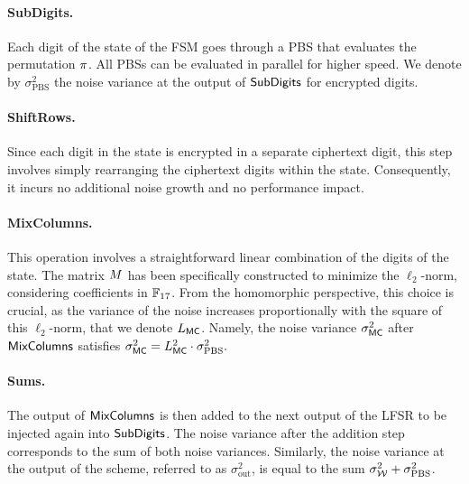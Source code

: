 \paragraph{SubDigits.} Each digit of the state of the FSM goes through a PBS that evaluates the permutation $\pi$. All PBSs can be evaluated in parallel for higher speed. We denote by $\sigma_{\text{PBS}}^2$ the noise variance at the output of $\text{\textsf{SubDigits}}$ for encrypted digits.


\paragraph{ShiftRows.} Since each digit in the state is encrypted in a separate ciphertext digit, this step involves simply rearranging the ciphertext digits within the state. Consequently, it incurs no additional noise growth and no performance impact.

\paragraph{MixColumns.} This operation involves a straightforward linear combination of the digits of the state. The matrix $M$ has been specifically constructed to minimize the $\ell_2$-norm, considering coefficients in $\mathbb{F}_{17}$. %
From the homomorphic perspective, this choice is crucial, as the variance of the noise increases proportionally with the square of this $\ell_2$-norm, that we denote $L_{\text{\textsf{MC}}}$. Namely, the noise variance $\sigma^2_{\text{\textsf{MC}}}$ after  $\text{\textsf{MixColumns}}$ satisfies $\sigma^2_{\text{\textsf{MC}}} = L_{\text{\textsf{MC}} }^2 \cdot \sigma_{\text{PBS}}^2.$


\paragraph{Sums.} The output of $\text{\textsf{MixColumns}}$ is then added to the next output of the LFSR to be injected again into $\text{\textsf{SubDigits}}$. The noise variance after the addition step corresponds to the sum of both noise variances. Similarly, the noise variance at the output of the scheme, referred to as $\sigma^2_{\text{out}}$, is equal to the sum $\sigma_{\mathcal{W}}^2 + \sigma_{\text{PBS}}^2$.

%


